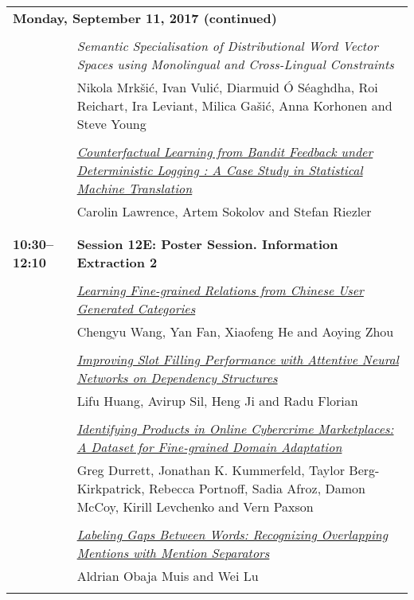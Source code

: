 \begin{tabular}{p{20mm}p{128mm}}
\\
\multicolumn{2}{l}{\bf Monday, September 11, 2017 (continued)} \\\\
 & {\em Semantic Specialisation of Distributional Word Vector Spaces using Monolingual and Cross-Lingual Constraints}\\
         & Nikola Mrk\v{s}i\'{c}, Ivan Vuli\'{c}, Diarmuid \'{O} S\'{e}aghdha, Roi Reichart, Ira Leviant, Milica Ga\v{s}i\'{c}, Anna Korhonen and Steve Young \\
\\

 & \hyperlink{page.2549}{\em Counterfactual Learning from Bandit Feedback under Deterministic Logging : A Case Study in Statistical Machine Translation}\\
         & Carolin Lawrence, Artem Sokolov and Stefan Riezler \\
\\

\\{\bf 10:30--12:10} & {\bf Session 12E: Poster Session. Information Extraction 2 } \\
\\
 & \hyperlink{page.2560}{\em Learning Fine-grained Relations from Chinese User Generated Categories}\\
         & Chengyu Wang, Yan Fan, Xiaofeng He and Aoying Zhou \\
\\

 & \hyperlink{page.2571}{\em Improving Slot Filling Performance with Attentive Neural Networks on Dependency Structures}\\
         & Lifu Huang, Avirup Sil, Heng Ji and Radu Florian \\
\\

 & \hyperlink{page.2581}{\em Identifying Products in Online Cybercrime Marketplaces: A Dataset for Fine-grained Domain Adaptation}\\
         & Greg Durrett, Jonathan K. Kummerfeld, Taylor Berg-Kirkpatrick, Rebecca Portnoff, Sadia Afroz, Damon McCoy, Kirill Levchenko and Vern Paxson \\
\\

 & \hyperlink{page.2591}{\em Labeling Gaps Between Words: Recognizing Overlapping Mentions with Mention Separators}\\
         & Aldrian Obaja Muis and Wei Lu \\
\\


\end{tabular}
